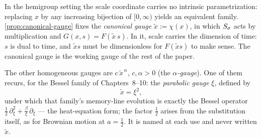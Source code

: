 \begin{remark}\label{rem:gauge-freedom}
In the hemigroup setting the scale coordinate carries no intrinsic parametrization: replacing
$x$ by any increasing bijection of $[0,\infty)$ yields an equivalent family.
\ref{prop:canonical-gauge} fixes the \emph{canonical gauge} $\tilde x := \chi(x)$,
in which $S_\sigma$ acts by multiplication and $G(x,s) = F(\tilde x\, s)$. In it, scale
carries the dimension of time: $s$ is dual to time, and $\tilde x s$ must be dimensionless for
$F(\tilde x s)$ to make sense. The canonical gauge is the working gauge of the rest of the
paper.

The other homogeneous gauges are $c\,\tilde x^{\,\alpha}$, $c, \alpha > 0$ (the
\emph{$\alpha$-gauge}). One of them
recurs, for the Bessel family of Chapters~8--10: the
\emph{parabolic gauge} $\xi$, defined by
\[
  \tilde x = \xi^2 ,
\]
under which that family's memory-line evolution is exactly the Bessel operator
$\tfrac12\,\partial_\xi^2 + \tfrac{\beta}{\xi}\,\partial_\xi$ --- the heat-equation form; the
factor $\tfrac12$ arises from the substitution itself, as for Brownian motion at $a = \tfrac12$.
It is named at each use and never written $\tilde x$.
\end{remark}
